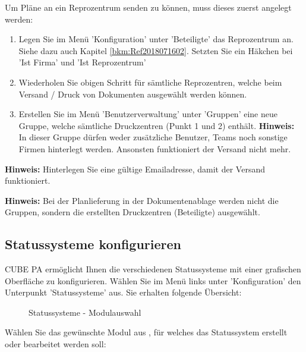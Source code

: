 Um Pläne an ein Reprozentrum senden zu können, muss dieses zuerst angelegt werden:

\begin{enumerate}
\item Legen Sie im Menü 'Konfiguration' unter 'Beteiligte' das Reprozentrum an. Siehe dazu auch Kapitel \ref{bkm:Ref2018071602}. Setzten Sie ein Häkchen bei 'Ist Firma' und 'Ist Reprozentrum'
\item Wiederholen Sie obigen Schritt für sämtliche Reprozentren, welche beim Versand / Druck von Dokumenten ausgewählt werden können.
\item Erstellen Sie im Menü 'Benutzerverwaltung' unter 'Gruppen' eine neue Gruppe, welche sämtliche Druckzentren (Punkt 1 und 2) enthält. \textbf{Hinweis:} In dieser Gruppe dürfen weder zusätzliche Benutzer, Teams noch sonstige Firmen hinterlegt werden. Ansonsten funktioniert der Versand nicht mehr.

\end{enumerate}

\textbf{Hinweis:} Hinterlegen Sie eine gültige Emailadresse, damit der Versand funktioniert.

\vspace{\baselineskip}

\textbf{Hinweis:} Bei der Planlieferung in der Dokumentenablage werden nicht die Gruppen, sondern die erstellten Druckzentren (Beteiligte) ausgewählt.

\subsection{Statussysteme konfigurieren}

CUBE PA ermöglicht Ihnen die verschiedenen Statussysteme mit einer grafischen Oberfläche zu konfigurieren. Wählen Sie im Menü links unter 'Konfiguration' den Unterpunkt 'Statussysteme' aus. Sie erhalten folgende Übersicht:

\begin{figure}[H]
\caption{Statussysteme - Modulauswahl}
\end{figure}

Wählen Sie das gewünschte Modul aus , für welches das Statussystem erstellt oder bearbeitet werden soll:

